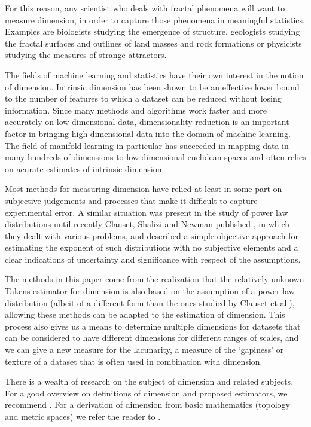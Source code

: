 \documentclass[11pt]{article}
\begin{document}
For this reason, any scientist who deals with fractal phenomena will want to measure dimension, in order to capture those phenomena in meaningful statistics. Examples are biologists studying the emergence of structure, geologists studying the fractal surfaces and outlines of land masses and rock formations or physicists studying the measures of strange attractors.

The fields of machine learning and statistics have their own interest in the notion of dimension. Intrinsic dimension has been shown to be an effective lower bound to the number of features to which a dataset can be reduced without losing information.\cite{kumaraswamy2008fractal} Since many methods and algorithms work faster and more accurately on low dimensional data, dimensionality reduction is an important factor in bringing high dimensional data into the domain of machine learning. The field of manifold learning in particular has succeeded in mapping data in many hundreds of dimensions to low dimensional euclidean spaces\cite{roweis2000nonlinear} and often relies on acurate estimates of intrinsic dimension.\cite{levina2004maximum} 

Most methods for measuring dimension have relied at least in some part on subjective judgements and processes that make it difficult to capture experimental error. A similar situation was present in the study of power law distributions until recently Clauset, Shalizi and Newman published \cite{clauset2007power}, in which they dealt with various problems, and described a simple objective approach for estimating the exponent of such distributions with no subjective elements and a clear indications of uncertainty and significance with respect of the assumptions.

The methods in this paper come from the realization that the relatively unknown Takens estimator for dimension is also based on the assumption of a power law distribution (albeit of a different form than the ones studied by Clauset et al.), allowing these methods can be adapted to the estimation of dimension. This process also gives us a means to determine multiple dimensions for datasets that can be considered to have different dimensions for different ranges of scales, and we can give a new measure for the lacunarity, a measure of the `gapiness' or texture of a dataset that is often used in combination with dimension. 

There is a wealth of research on the subject of dimension and related subjects. For a good overview on definitions of dimension and proposed estimators, we recommend \cite{theiler1990estimating}. For a derivation of dimension from basic mathematics (topology and metric spaces) we refer the reader to \cite{edgar2008measure}.
\end{document}
